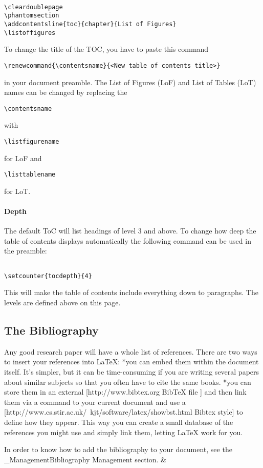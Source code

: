 \begin{lstlisting}

\cleardoublepage
\phantomsection
\addcontentsline{toc}{chapter}{List of Figures}
\listoffigures

\end{lstlisting}


To change the title of the TOC, you have to paste this command \begin{lstlisting}
\renewcommand{\contentsname}{<New table of contents title>}
\end{lstlisting}
 in your document preamble.  The List of Figures (LoF) and List of Tables (LoT) names can be changed by replacing the \begin{lstlisting}
\contentsname
\end{lstlisting}
 with \begin{lstlisting}
\listfigurename
\end{lstlisting}
 for LoF and \begin{lstlisting}
\listtablename
\end{lstlisting}
 for LoT.

\paragraph{ Depth }
The default ToC will list headings of level 3 and above.  To change how deep the table of contents displays automatically the following command can be used in the preamble:

\begin{lstlisting}

\setcounter{tocdepth}{4}

\end{lstlisting}


This will make the table of contents include everything down to paragraphs.   The levels are defined above on this page.

\subsection{ The Bibliography }

Any good research paper will have a whole list of references. There are two ways to insert your references into LaTeX: 
*you can embed them within the document itself. It's simpler, but it can be time-consuming if you are writing several papers about similar subjects so that you often have to cite the same books.
*you can store them in an external [http://www.bibtex.org BibTeX file ] and then link them via a command to your current document and use a [http://www.cs.stir.ac.uk/~kjt/software/latex/showbst.html Bibtex style] to define how they appear. This way you can create a small database of the references you might use and simply link them, letting LaTeX work for you.

In order to know how to add the bibliography to your document, see the \_ManagementBibliography Management section. &
